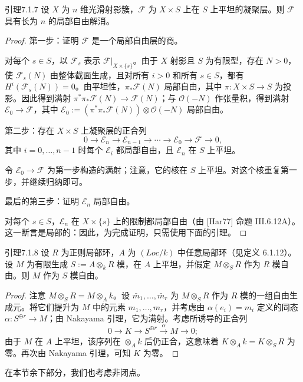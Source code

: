 \begin{origstatement}{引理}{7.1.7}\label{ch07:7.1.7}
设 $X$ 为 $n$ 维光滑射影簇，$\mathcal F$ 为 $X\times S$ 上在 $S$ 上平坦的凝聚层。则 $\mathcal F$ 具有长为 $n$ 的局部自由解消。
\end{origstatement}
\begin{proof}
第一步：证明 $\mathcal F$ 是一个局部自由层的商。

对每个 $s\in S$，以 $\mathcal F_s$ 表示 $\mathcal F|_{X\times\{s\}}$。由于 $X$ 射影且 $S$ 为有限型，存在 $N>0$，使 $\mathcal F_s(N)$ 由整体截面生成，且对所有 $i>0$ 和所有 $s\in S$，都有 $H^i(\mathcal F_s(N))=0$。由平坦性，$\pi_*\mathcal F(N)$ 局部自由，其中 $\pi:X\times S\to S$ 为投影。因此得到满射 $\pi^*\pi_*\mathcal F(N)\to\mathcal F(N)$；与 $\mathcal O(-N)$ 作张量积，得到满射 $\mathcal E_0\to\mathcal F$，其中 $\mathcal E_0:=(\pi^*\pi_*\mathcal F(N))\otimes\mathcal O(-N)$ 局部自由。

第二步：存在 $X\times S$ 上凝聚层的正合列
\[
0\longrightarrow\mathcal E_n\longrightarrow\mathcal E_{n-1}
\longrightarrow\cdots\longrightarrow\mathcal E_0\longrightarrow\mathcal F\longrightarrow0,
\]
其中 $i=0,\ldots,n-1$ 时每个 $\mathcal E_i$ 都局部自由，且 $\mathcal E_n$ 在 $S$ 上平坦。

令 $\mathcal E_0\to\mathcal F$ 为第一步构造的满射；注意，它的核在 $S$ 上平坦。对这个核重复第一步，并继续归纳即可。

最后的第三步：证明 $\mathcal E_n$ 局部自由。

对每个 $s\in S$，$\mathcal E_n$ 在 $X\times\{s\}$ 上的限制都局部自由（由 [Har77] 命题 III.6.12A）。这一断言是局部的：因此，为完成证明，只需使用下面的引理。
\end{proof}
\begin{origstatement}{引理}{7.1.8}\label{ch07:7.1.8}
设 $R$ 为正则局部环，$A$ 为 $(Loc/k)$ 中任意局部环（见定义 6.1.12）。设 $M$ 为有限生成 $S:=A\otimes_k R$ 模，在 $A$ 上平坦，并假定 $M\otimes_S R$ 作为 $R$ 模自由。则 $M$ 作为 $S$ 模自由。
\end{origstatement}
\begin{proof}
注意 $M\otimes_S R=M\otimes_A k$。设 $\bar m_1,\ldots,\bar m_r$ 为 $M\otimes_S R$ 作为 $R$ 模的一组自由生成元。将它们提升为 $M$ 中的元素 $m_1,\ldots,m_r$，并考虑由 $\alpha(e_i)=m_i$ 定义的同态 $\alpha:S^{\oplus r}\to M$；由 Nakayama 引理，它为满射。考虑所诱导的正合列
\[
0\longrightarrow K\longrightarrow S^{\oplus r}\xrightarrow{\alpha}M\longrightarrow0;
\]
由于 $M$ 在 $A$ 上平坦，该序列在 $\otimes_A k$ 后仍正合，这意味着 $K\otimes_A k=K\otimes_S R$ 为零。再次由 Nakayama 引理，可知 $K$ 为零。
\end{proof}
在本节余下部分，我们也考虑非闭点。


